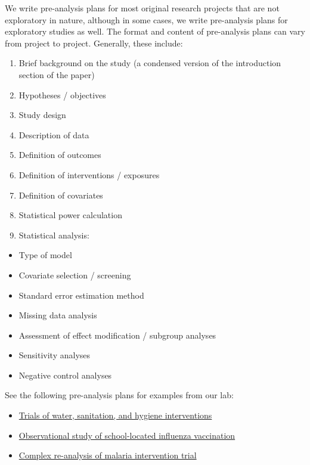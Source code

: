 \documentclass[
]{book}
\providecommand{\tightlist}{%
  \setlength{\itemsep}{0pt}\setlength{\parskip}{0pt}}
\begin{document}
We write pre-analysis plans for most original research projects that are not exploratory in nature, although in some cases, we write pre-analysis plans for exploratory studies as well. The format and content of pre-analysis plans can vary from project to project. Generally, these include:

\begin{enumerate}
\def\labelenumi{\arabic{enumi}.}
\tightlist
\item
  Brief background on the study (a condensed version of the introduction section of the paper)
\item
  Hypotheses / objectives
\item
  Study design
\item
  Description of data
\item
  Definition of outcomes
\item
  Definition of interventions / exposures
\item
  Definition of covariates
\item
  Statistical power calculation
\item
  Statistical analysis:
\end{enumerate}

\begin{itemize}
\tightlist
\item
  Type of model
\item
  Covariate selection / screening
\item
  Standard error estimation method
\item
  Missing data analysis
\item
  Assessment of effect modification / subgroup analyses
\item
  Sensitivity analyses
\item
  Negative control analyses
\end{itemize}

See the following pre-analysis plans for examples from our lab:

\begin{itemize}
\tightlist
\item
  \href{https://osf.io/tprw2/}{Trials of water, sanitation, and hygiene interventions}
\item
  \href{https://osf.io/c8xuq/}{Observational study of school-located influenza vaccination}
\item
  \href{https://osf.io/rb3cw/}{Complex re-analysis of malaria intervention trial}
\end{itemize}
\end{document}

